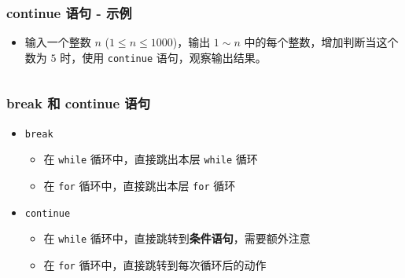 \begin{frame}[fragile]
    \frametitle{continue 语句 - 示例}

    \begin{itemize}
        \item 输入一个整数 $n$ ($1 \le n \le 1000$)，输出 $1 \sim n$ 中的每个整数，增加判断当这个数为 $5$ 时，使用 \lstinline|continue| 语句，观察输出结果。
    \end{itemize}

    \begin{columns}[T]


    \end{columns}


\end{frame}

\begin{frame}[fragile]
    \frametitle{break 和 continue 语句}

    \begin{itemize}
        \item \lstinline|break|
            \begin{itemize}
                \item 在 \lstinline|while| 循环中，直接跳出本层 \lstinline|while| 循环
                \item 在 \lstinline|for| 循环中，直接跳出本层 \lstinline|for| 循环
            \end{itemize}
        \item \lstinline|continue|
            \begin{itemize}
                \item 在 \lstinline|while| 循环中，直接跳转到\textbf{条件语句}，需要额外注意
                \item 在 \lstinline|for| 循环中，直接跳转到每次循环后的动作
            \end{itemize}
    \end{itemize}

\end{frame}

